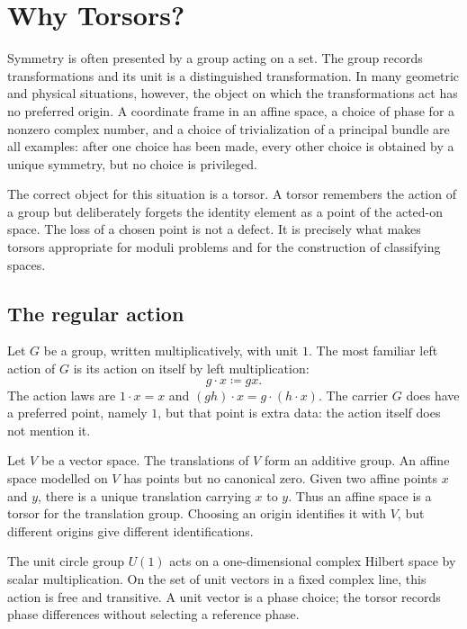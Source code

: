 \section{Why Torsors?}
\label{ch:why}

Symmetry is often presented by a group acting on a set. The group records transformations and its unit is a distinguished transformation. In many geometric and physical situations, however, the object on which the transformations act has no preferred origin. A coordinate frame in an affine space, a choice of phase for a nonzero complex number, and a choice of trivialization of a principal bundle are all examples: after one choice has been made, every other choice is obtained by a unique symmetry, but no choice is privileged.

The correct object for this situation is a torsor. A torsor remembers the action of a group but deliberately forgets the identity element as a point of the acted-on space. The loss of a chosen point is not a defect. It is precisely what makes torsors appropriate for moduli problems and for the construction of classifying spaces.

\subsection{The regular action}
Let $G$ be a group, written multiplicatively, with unit $1$. The most familiar left action of $G$ is its action on itself by left multiplication:
\begin{equation}
g\cdot x \coloneqq gx.
\end{equation}
The action laws are $1\cdot x=x$ and $(gh)\cdot x=g\cdot(h\cdot x)$. The carrier $G$ does have a preferred point, namely $1$, but that point is extra data: the action itself does not mention it.

\begin{example}
Let $V$ be a vector space. The translations of $V$ form an additive group. An affine space modelled on $V$ has points but no canonical zero. Given two affine points $x$ and $y$, there is a unique translation carrying $x$ to $y$. Thus an affine space is a torsor for the translation group. Choosing an origin identifies it with $V$, but different origins give different identifications.
\end{example}

\begin{example}[Phases]
The unit circle group $U(1)$ acts on a one-dimensional complex Hilbert space by scalar multiplication. On the set of unit vectors in a fixed complex line, this action is free and transitive. A unit vector is a phase choice; the torsor records phase differences without selecting a reference phase.
\end{example}

